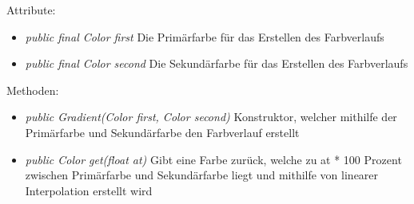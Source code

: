     Attribute:
\begin{itemize}
    \item \emph{public final Color first} Die Primärfarbe für das Erstellen des Farbverlaufs
    \item \emph{public final Color second} Die Sekundärfarbe für das Erstellen des Farbverlaufs
\end{itemize}
Methoden:
\begin{itemize}
    \item \emph{public Gradient(Color first, Color second)} Konstruktor, welcher mithilfe der Primärfarbe und Sekundärfarbe den Farbverlauf erstellt
    \item \emph{public Color get(float at)} Gibt eine Farbe zurück, welche zu at * 100 Prozent zwischen Primärfarbe und Sekundärfarbe liegt und mithilfe von linearer Interpolation erstellt wird
\end{itemize}
